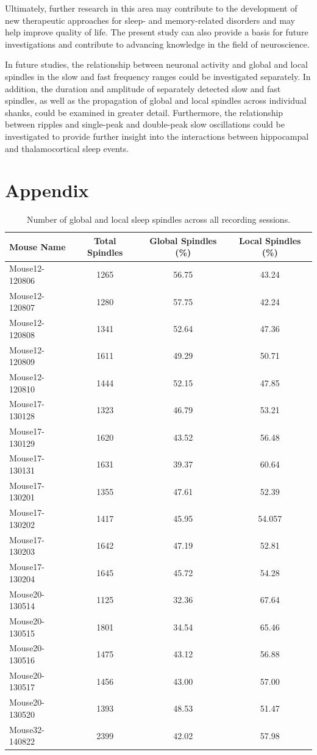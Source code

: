 \documentclass[12pt]{report}
\begin{document}
Ultimately, further research in this area may contribute to the development of new therapeutic approaches for sleep- and memory-related disorders and may help improve quality of life. The present study can also provide a basis for future investigations and contribute to advancing knowledge in the field of neuroscience.

In future studies, the relationship between neuronal activity and global and local spindles in the slow and fast frequency ranges could be investigated separately. In addition, the duration and amplitude of separately detected slow and fast spindles, as well as the propagation of global and local spindles across individual shanks, could be examined in greater detail. Furthermore, the relationship between ripples and single-peak and double-peak slow oscillations could be investigated to provide further insight into the interactions between hippocampal and thalamocortical sleep events.


\chapter{Appendix}
\appendix
\label{appendix1}

\begin{table}[H]%
	\centering
	\caption{Number of global and local sleep spindles across all recording sessions.}
	\label{tab:global_local_spindles}
	\begin{tabular}{lccc}
		\hline
		\textbf{Mouse Name} & \textbf{Total Spindles} & \textbf{Global Spindles (\%)} & \textbf{Local Spindles (\%)} \\
		\hline
		Mouse12-120806 & 1265 & 56.75 & 43.24 \\
		Mouse12-120807 & 1280 & 57.75 & 42.24 \\
		Mouse12-120808 & 1341 & 52.64 & 47.36 \\
		Mouse12-120809 & 1611 & 49.29 & 50.71 \\
		Mouse12-120810 & 1444 & 52.15 & 47.85 \\
		Mouse17-130128 & 1323 & 46.79 & 53.21 \\
		Mouse17-130129 & 1620 & 43.52 & 56.48 \\
		Mouse17-130131 & 1631 & 39.37 & 60.64 \\
		Mouse17-130201 & 1355 & 47.61 & 52.39 \\
		Mouse17-130202 & 1417 & 45.95 & 54.057 \\
		Mouse17-130203 & 1642 & 47.19 & 52.81 \\
		Mouse17-130204 & 1645 & 45.72 & 54.28 \\
		Mouse20-130514 & 1125 & 32.36 & 67.64 \\
		Mouse20-130515 & 1801 & 34.54 & 65.46 \\
		Mouse20-130516 & 1475 & 43.12 & 56.88 \\
		Mouse20-130517 & 1456 & 43.00 & 57.00 \\
		Mouse20-130520 & 1393 & 48.53 & 51.47 \\
		Mouse32-140822 & 2399 & 42.02 & 57.98 \\
		\hline
	\end{tabular}
\end{table}
\end{document}
